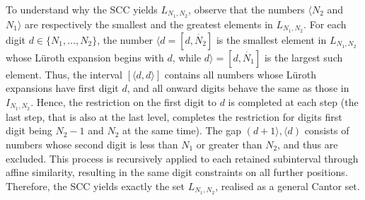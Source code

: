 \documentclass{ws-ijnt}
\begin{document}
	To understand why the SCC yields $L_{N_1,N_2}$, observe that the numbers $\langle N_2$ and $N_1\rangle$ are respectively the smallest and the greatest elements in $L_{N_1,N_2}$. For each digit $d \in \{N_1, \dots, N_2\}$, the number $\langle d=[d, \dot{N_2}]$ is the smallest element in $L_{N_1,N_2}$ whose L\"uroth expansion begins with $d$, while $d\rangle=[d, \dot{N_1}]$ is the largest such element. Thus, the interval $[\langle d, d\rangle]$ contains all numbers whose L\"uroth expansions have first digit $d$, and all onward digits behave the same as those in $I_{N_1,N_2}$. Hence, the restriction on the first digit to $d$ is completed at each step (the last step, that is also at the last level, completes the restriction for digits first digit being $N_2-1$ and $N_2$ at the same time). The gap $(d+1\rangle, \langle d)$ consists of numbers whose second digit is less than $N_1$ or greater than $N_2$, and thus are excluded. This process is recursively applied to each retained subinterval through affine similarity, resulting in the same digit constraints on all further positions. Therefore, the SCC yields exactly the set $L_{N_1,N_2}$, realised as a general Cantor set.
	
\end{document}
